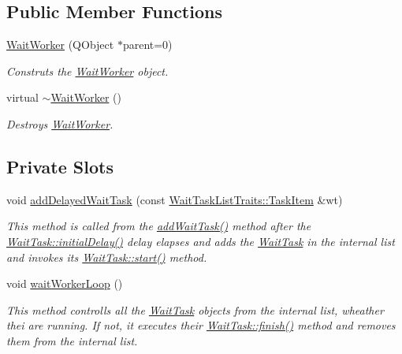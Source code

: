 \subsection*{Public Member Functions}
\begin{DoxyCompactItemize}
\item 
\hyperlink{class_wait_worker_ab775487e06899dc74d8992c996606f8f}{Wait\+Worker} (Q\+Object $\ast$parent=0)
\begin{DoxyCompactList}\small\item\em Construts the \hyperlink{class_wait_worker}{Wait\+Worker} object. \end{DoxyCompactList}\item 
\hypertarget{class_wait_worker_a767f19b8b71eff239a9481ede483dee4}{}virtual \hyperlink{class_wait_worker_a767f19b8b71eff239a9481ede483dee4}{$\sim$\+Wait\+Worker} ()\label{class_wait_worker_a767f19b8b71eff239a9481ede483dee4}

\begin{DoxyCompactList}\small\item\em Destroys \hyperlink{class_wait_worker}{Wait\+Worker}. \end{DoxyCompactList}\end{DoxyCompactItemize}
\subsection*{Private Slots}
\begin{DoxyCompactItemize}
\item 
void \hyperlink{class_wait_worker_a71dec4dbc5a123f20d0a5a7f707ed5a3}{add\+Delayed\+Wait\+Task} (const \hyperlink{struct_wait_task_list_traits_1_1_task_item}{Wait\+Task\+List\+Traits\+::\+Task\+Item} \&wt)
\begin{DoxyCompactList}\small\item\em This method is called from the \hyperlink{class_wait_worker_adaff9ea88795fa9d902711c1952828cd}{add\+Wait\+Task()} method after the \hyperlink{class_wait_task_a3984ae37eae1a984db2f2417df2bfbbf}{Wait\+Task\+::initial\+Delay()} delay elapses and adds the \hyperlink{class_wait_task}{Wait\+Task} in the internal list and invokes its \hyperlink{class_wait_task_ab20934c4c6723db758564eef74eec5c4}{Wait\+Task\+::start()} method. \end{DoxyCompactList}\item 
\hypertarget{class_wait_worker_a434d284c0e08697979b5c8c1a53fd529}{}void \hyperlink{class_wait_worker_a434d284c0e08697979b5c8c1a53fd529}{wait\+Worker\+Loop} ()\label{class_wait_worker_a434d284c0e08697979b5c8c1a53fd529}

\begin{DoxyCompactList}\small\item\em This method controlls all the \hyperlink{class_wait_task}{Wait\+Task} objects from the internal list, wheather thei are running. If not, it executes their \hyperlink{class_wait_task_a5f3a89b190e0ef7443cc3b9cc8857e9a}{Wait\+Task\+::finish()} method and removes them from the internal list. \end{DoxyCompactList}\end{DoxyCompactItemize}
